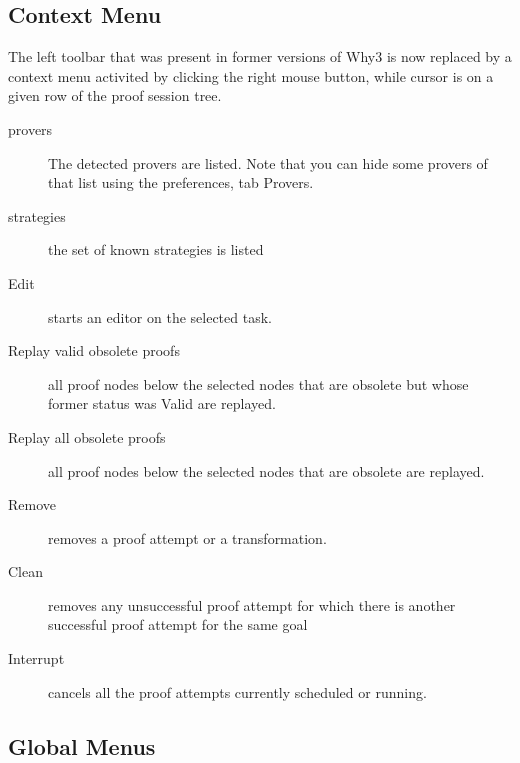 \subsection{Context Menu}

The left toolbar that was present in former versions of Why3 is now
replaced by a context menu activited by clicking the right mouse button,
while cursor is on a given row of the proof session tree.

\begin{description}
\item[provers] The detected provers are listed. Note that you can hide some provers of that list using the preferences, tab \textsf{Provers}.
\item[strategies] the set of known strategies is listed
\item[Edit] starts an editor on the selected task.
\item[Replay valid obsolete proofs] all proof nodes below the selected nodes that are obsolete but whose former status was Valid are replayed.
\item[Replay all obsolete proofs] all proof nodes below the selected nodes that are obsolete are replayed.
\item[Remove] removes a proof attempt or a transformation.
\item[Clean] removes any unsuccessful proof attempt for which there is
  another successful proof attempt for the same goal
\item[Interrupt] cancels all the proof attempts currently scheduled or running.
\end{description}

\subsection{Global Menus}

